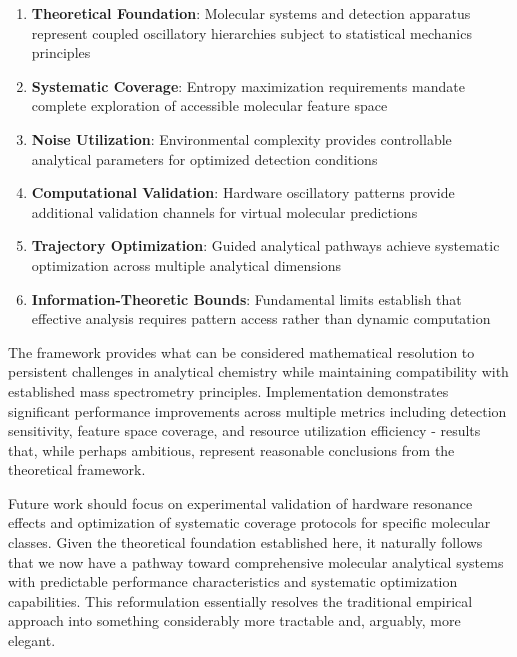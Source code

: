 \documentclass[11pt,a4paper]{article}
\begin{document}
\begin{enumerate}
\item \textbf{Theoretical Foundation}: Molecular systems and detection apparatus represent coupled oscillatory hierarchies subject to statistical mechanics principles

\item \textbf{Systematic Coverage}: Entropy maximization requirements mandate complete exploration of accessible molecular feature space

\item \textbf{Noise Utilization}: Environmental complexity provides controllable analytical parameters for optimized detection conditions

\item \textbf{Computational Validation}: Hardware oscillatory patterns provide additional validation channels for virtual molecular predictions

\item \textbf{Trajectory Optimization}: Guided analytical pathways achieve systematic optimization across multiple analytical dimensions

\item \textbf{Information-Theoretic Bounds}: Fundamental limits establish that effective analysis requires pattern access rather than dynamic computation
\end{enumerate}

The framework provides what can be considered mathematical resolution to persistent challenges in analytical chemistry while maintaining compatibility with established mass spectrometry principles. Implementation demonstrates significant performance improvements across multiple metrics including detection sensitivity, feature space coverage, and resource utilization efficiency - results that, while perhaps ambitious, represent reasonable conclusions from the theoretical framework.

Future work should focus on experimental validation of hardware resonance effects and optimization of systematic coverage protocols for specific molecular classes. Given the theoretical foundation established here, it naturally follows that we now have a pathway toward comprehensive molecular analytical systems with predictable performance characteristics and systematic optimization capabilities. This reformulation essentially resolves the traditional empirical approach into something considerably more tractable and, arguably, more elegant.
\end{document}
